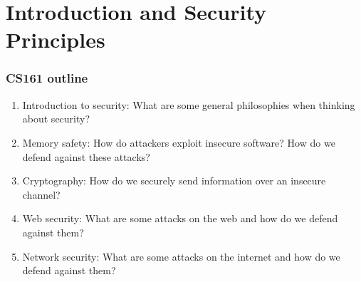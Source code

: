 \chapter{Introduction and Security Principles}

\subsection{CS161 outline}
\begin{enumerate}
    \item Introduction to security: What are some general philosophies when thinking about security?
    \item Memory safety: How do attackers exploit insecure software? How do we defend against these attacks?
    \item Cryptography: How do we securely send information over an insecure channel?
    \item Web security: What are some attacks on the web and how do we defend against them?
    \item Network security: What are some attacks on the internet and how do we defend against them?
\end{enumerate}

